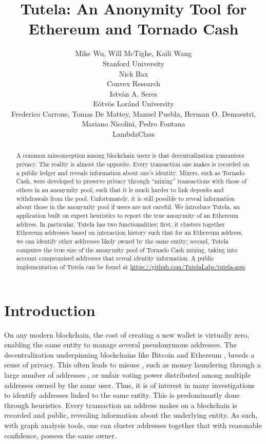 \documentclass[11pt,a4paper]{article}
\title{Tutela: An Anonymity Tool for Ethereum and Tornado Cash}
\author{
  \small{Mike Wu, Will McTighe, Kaili Wang}\\
  \small{Stanford University} \\ \And
  \small{Nick Bax} \\
  \small{Convex Research} \\ \And
  \small{Istv\'{a}n A. Seres} \\
  \small{E\"{o}tv\"{o}s Lor\'{a}nd University} \\ \AND
  \small{Frederico Carrone, Tomas De Mattey, Manuel Puebla, Herman O. Demaestri, Mariano Nicolini, Pedro Fontana} \\
  \small{LambdaClass} \\}
\date{}
\begin{document}
\maketitle
\begin{abstract}
A common misconception among blockchain users is that decentralization guarantees privacy. The reality is almost the opposite. Every transaction one makes is recorded on a public ledger and reveals information about one's identity.
Mixers, such as Tornado Cash, were developed to preserve privacy through ``mixing'' transactions with those of others in an anonymity pool, such that it is much harder to link deposits and withdrawals from the pool. Unfortunately, it is still possible to reveal information about those in the anonymity pool if users are not careful.
We introduce Tutela, an application built on expert heuristics to report the true anonymity of an Ethereum address.
In particular, Tutela has two functionalities: first, it clusters together Ethereum addresses based on interaction history such that for an Ethereum address, we can identify other addresses likely owned by the same entity; second, Tutela computes the true size of the anonymity pool of Tornado Cash mixing, taking into account compromised addresses that reveal identity information. A public implementation of Tutela can be found at \url{https://github.com/TutelaLabs/tutela-app}.
\end{abstract}

\section{Introduction}

On any modern blockchain, the cost of creating a new wallet is virtually zero, enabling the same entity to manage several pseudonymous addresses. The decentralization underpinning blockchains like Bitcoin \citep{nakamoto2008bitcoin} and Ethereum \citep{buterin2013ethereum}, breeds a sense of privacy. This often leads to misuse \citep{christin2013traveling}, such as money laundering through a large number of addresses \citep{moser2013inquiry}, or unfair voting power distributed among multiple addresses owned by the same user. Thus, it is of interest in many investigations to identify addresses linked to the same entity. This is predominantly done through heuristics. Every transaction an address makes on a blockchain is recorded and public, revealing information about the underlying entity. As such, with graph analysis tools, one can cluster addresses together that with reasonable confidence, possess the same owner.
\end{document}
